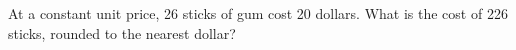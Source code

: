 At a constant unit price, 26 sticks of gum cost 20 dollars. What is the cost of 226 sticks, rounded to the nearest dollar?
